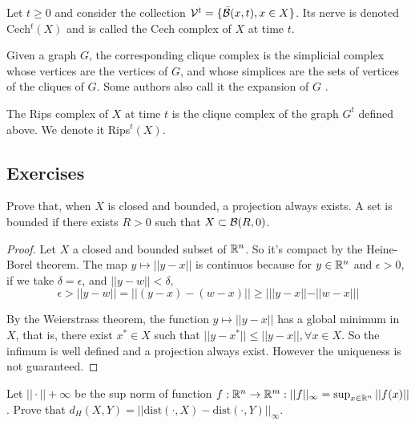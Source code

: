 \begin{definition}
    Let $t \ge 0$ and consider the collection $\mathcal{V}^t = \{
    \bar{\mathcal{B}}(x,t), x \in X\}$. Its nerve is denoted Cech$^t(X)$ and is called the Cech complex of $X$ at time $t$.
\end{definition}

\begin{definition}
    Given a graph $G$, the corresponding clique complex is the simplicial
    complex whose vertices are the vertices of $G$, and whose simplices are
    the sets of vertices of the cliques of $G$. Some authors also call it the
    expansion of $G$
    .
\end{definition}

\begin{definition}
    The Rips complex of $X$ at time $t$ is the clique complex of the graph
    $G^t$ defined above. We denote it Rips$^t(X).$
\end{definition}

\subsection{Exercises}

\begin{exercise}
    Prove that, when $X$ is closed and bounded, a projection always exists. A set is bounded if there exists $R > 0$ such that $X \subset \mathcal{B}(R, 0)$.
\end{exercise}

\begin{proof}

Let $X$ a closed and bounded subset of $\mathbb{R}^n$. So it's compact by the
Heine-Borel theorem. The map $y \mapsto ||y - x||$ is continuos because for $y
\in \mathbb{R}^n$ and $\epsilon > 0$, if we take $\delta = \epsilon$, and $||y - w|| <
\delta, $
$$
\epsilon > ||y - w|| = ||(y - x) - (w - x)|| \ge |||y-x|| - ||w-x|||
$$

By the Weierstrass theorem, the function $y \mapsto ||y-x||$ has a global
minimum in $X$, that is, there exist $x^* \in X$ such that $||y - x^*|| \le
||y - x||, \forall x \in X$. So the infimum is well defined and a projection
always exist. However the uniqueness is not guaranteed.

\end{proof}

\noindent\linia

\begin{exercise}
    Let $||\cdot||+{\infty}$ be the sup norm of function $f : \mathbb{R}^n \to \mathbb{R}^m:
    ||f||_{\infty} = \sup_{x \in \mathbb{R}^n} ||f(x)||$. Prove that $d_H(X, Y) = ||\text{dist}(\cdot, X) - \text{dist}(\cdot, Y)||_{\infty}$.
\end{exercise}

